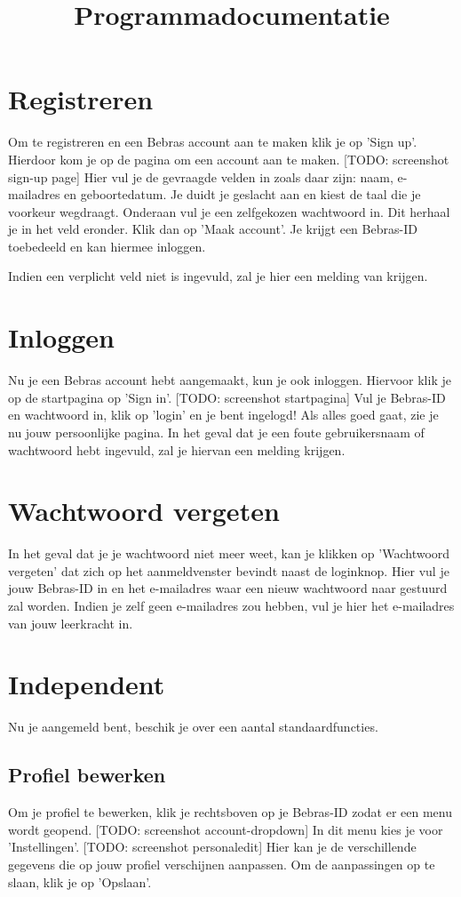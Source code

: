 \documentclass[]{article}
\title{
    Programmadocumentatie
}
\begin{document}
\maketitle

\section{Registreren}
Om te registreren en een Bebras account aan te maken klik je op 'Sign up'. Hierdoor kom je op de pagina om een account aan te maken. [TODO: screenshot sign-up page] Hier vul je de gevraagde velden in zoals daar zijn: naam, e-mailadres en geboortedatum. Je duidt je geslacht aan en kiest de taal die je voorkeur wegdraagt. Onderaan vul je een zelfgekozen wachtwoord in. Dit herhaal je in het veld eronder. Klik dan op 'Maak account'. Je krijgt een Bebras-ID toebedeeld en kan hiermee inloggen.

Indien een verplicht veld niet is ingevuld, zal je hier een melding van krijgen. 

\section{Inloggen}
Nu je een Bebras account hebt aangemaakt, kun je ook inloggen. Hiervoor klik je op de startpagina op 'Sign in'. [TODO: screenshot startpagina] Vul je Bebras-ID en wachtwoord in, klik op 'login' en je bent ingelogd! Als alles goed gaat, zie je nu jouw persoonlijke pagina. In het geval dat je een foute gebruikersnaam of wachtwoord hebt ingevuld, zal je hiervan een melding krijgen.

\section{Wachtwoord vergeten}
In het geval dat je je wachtwoord niet meer weet, kan je klikken op 'Wachtwoord vergeten' dat zich op het aanmeldvenster bevindt naast de loginknop. Hier vul je jouw Bebras-ID in en het e-mailadres waar een nieuw wachtwoord naar gestuurd zal worden. Indien je zelf geen e-mailadres zou hebben, vul je hier het e-mailadres van jouw leerkracht in.

\section{Independent}

Nu je aangemeld bent, beschik je over een aantal standaardfuncties.

\subsection{Profiel bewerken}
Om je profiel te bewerken, klik je rechtsboven op je Bebras-ID zodat er een menu wordt geopend. [TODO: screenshot account-dropdown] In dit menu kies je voor 'Instellingen'. [TODO: screenshot personaledit] Hier kan je de verschillende gegevens die op jouw profiel verschijnen aanpassen. Om de aanpassingen op te slaan, klik je op 'Opslaan'.
\end{document}
